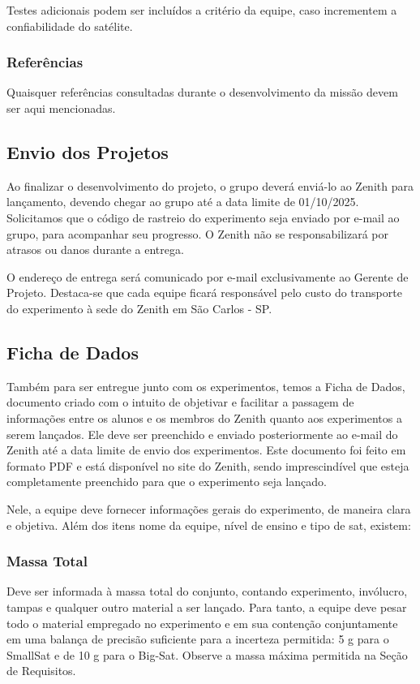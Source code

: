            Testes adicionais podem ser incluídos a critério da equipe, caso incrementem a confiabilidade do satélite.

        \subsubsection{Referências}
            Quaisquer referências consultadas durante o desenvolvimento da missão devem ser aqui mencionadas.

    \subsection{Envio dos Projetos}
        Ao finalizar o desenvolvimento do projeto, o grupo deverá enviá-lo ao Zenith para 
        lançamento, devendo chegar ao grupo até a data limite de 01/10/2025. 
        Solicitamos que o código de rastreio do experimento seja enviado por 
        e-mail ao grupo, para acompanhar seu progresso. O Zenith não se responsabilizará 
        por atrasos ou danos durante a entrega.
        
        O endereço de entrega será comunicado por e-mail exclusivamente ao Gerente de Projeto. Destaca-se que cada equipe ficará responsável pelo custo do transporte do experimento à sede do Zenith em São Carlos - SP.
    
    \subsection{Ficha de Dados}
        Também para ser entregue junto com os experimentos, temos a Ficha de Dados, documento criado com o intuito de objetivar e facilitar a passagem de informações entre os alunos e os membros do Zenith quanto aos experimentos a serem lançados. Ele deve ser preenchido e enviado posteriormente ao e-mail do Zenith até a data limite de envio dos experimentos. Este documento foi feito em formato PDF e está disponível no site do Zenith, sendo imprescindível que esteja completamente preenchido para que o experimento seja lançado.
        
        Nele, a equipe deve fornecer informações gerais do experimento, de maneira clara e objetiva. Além dos itens nome da equipe, nível de ensino e tipo de sat, existem:

        \subsubsection{Massa Total}
            Deve ser informada à massa total do conjunto, contando experimento, invólucro, tampas e qualquer outro material a ser lançado. Para tanto, a equipe deve pesar todo o material empregado no experimento e em sua contenção conjuntamente em uma balança de precisão suficiente para a incerteza permitida: 5 g para o SmallSat e de 10 g para o Big-Sat. Observe a massa máxima permitida na Seção de Requisitos.
            
